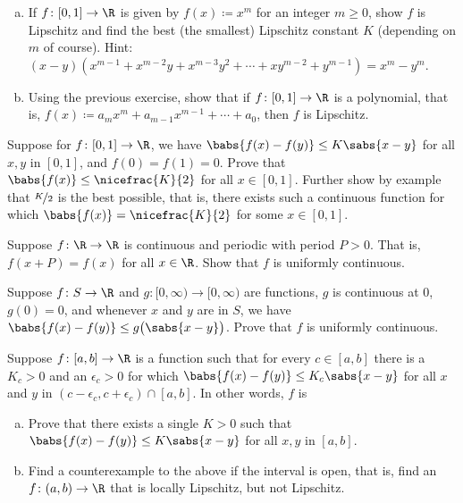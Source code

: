 \begin{exercise}
\pagebreak[2]
\leavevmode
\begin{enumerate}[a)]
\item
If $f \colon [0,1] \to \R$ is given by $f(x) \coloneqq x^m$ for an integer
$m \geq 0$,
show $f$ is Lipschitz and find the best (the smallest) Lipschitz constant
$K$ (depending on $m$ of course).
Hint: $(x-y)(x^{m-1} + x^{m-2}y + x^{m-3}y^2 + \cdots + x y^{m-2} + y^{m-1}) = x^m - y^m$.
\item
Using the previous exercise, show that if $f \colon [0,1] \to \R$
is a polynomial, that is, $f(x) \coloneqq a_m x^m + a_{m-1} x^{m-1} + \cdots + a_0$,
then $f$ is Lipschitz.
\end{enumerate}
\end{exercise}

\begin{exercise}
\pagebreak[2]
Suppose for $f \colon [0,1] \to \R$, we have $\babs{f(x)-f(y)} \leq K
\sabs{x-y}$ for all $x,y$ in $[0,1]$,
and $f(0) = f(1) = 0$.
Prove that $\babs{f(x)} \leq \nicefrac{K}{2}$ for all $x \in [0,1]$.  Further show by example that
$\nicefrac{K}{2}$ is the best possible, that is, there exists such a continuous function
for which $\babs{f(x)} = \nicefrac{K}{2}$ for some $x \in [0,1]$.
\end{exercise}

\begin{exercise}
Suppose $f \colon \R \to \R$ is continuous and periodic with period
$P > 0$.  That is, $f(x+P) = f(x)$ for all $x \in \R$.  Show that $f$
is uniformly continuous.
\end{exercise}

\begin{exercise}
Suppose $f \colon S \to \R$ and $g \colon [0,\infty) \to [0,\infty)$
are functions, $g$ is continuous at $0$, $g(0) = 0$, and
whenever $x$ and $y$ are in $S$, we have $\babs{f(x)-f(y)} \leq
g\bigl(\sabs{x-y}\bigr)$.
Prove that $f$ is uniformly continuous.
\end{exercise}

\begin{exercise}
Suppose $f \colon [a,b] \to \R$ is a function such that for every $c \in
[a,b]$ there is a $K_c > 0$ and an $\epsilon_c > 0$ for which
$\babs{f(x)-f(y)} \leq K_c \sabs{x-y}$ for all $x$ and $y$ in
$(c-\epsilon_c,c+\epsilon_c) \cap [a,b]$.  In other words, $f$ is
\begin{enumerate}[a)]
\item
Prove that there exists a single $K > 0$ such that
$\babs{f(x)-f(y)} \leq K \sabs{x-y}$ for all $x,y$ in $[a,b]$.
\item
Find a counterexample to the above if the interval is open, that is,
find an $f \colon (a,b) \to \R$ that is locally Lipschitz, but not
Lipschitz.
\end{enumerate}
\end{exercise}

